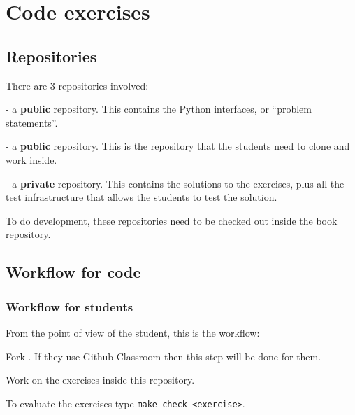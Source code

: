 
\section{Code exercises}

\subsection{Repositories}
There are 3 repositories involved:
\begin{compactenum}
    \item {} - a \textbf{public} repository.
          This contains the Python interfaces, or ``problem statements''.
    \item {} - a \textbf{public} repository.
          This is the repository that the students need to clone and work inside.
    \item {} - a \textbf{private} repository.
          This contains the solutions to the exercises, plus all the test infrastructure that allows the students to test the solution.
\end{compactenum}

To do development, these repositories need to be checked out inside the book repository.

\subsection{Workflow for code}

\subsubsection{Workflow for students}

From the point of view of the student, this is the workflow:

\begin{compactenum}
    \item Fork .
          If they use Github Classroom then this step will be done for them.
    \item Work on the exercises inside this repository.
    \item To evaluate the exercises type \texttt{make check-<exercise>}.
\end{compactenum}

